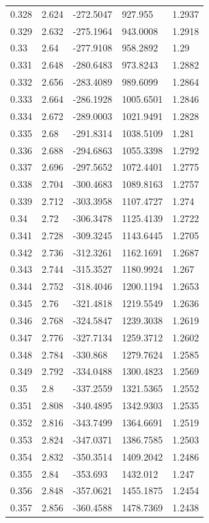 \begin{tabular}{lllll}
0.328 & 2.624 & -272.5047 & 927.955 & 1.2937 \\
0.329 & 2.632 & -275.1964 & 943.0008 & 1.2918 \\
0.33 & 2.64 & -277.9108 & 958.2892 & 1.29 \\
0.331 & 2.648 & -280.6483 & 973.8243 & 1.2882 \\
0.332 & 2.656 & -283.4089 & 989.6099 & 1.2864 \\
0.333 & 2.664 & -286.1928 & 1005.6501 & 1.2846 \\
0.334 & 2.672 & -289.0003 & 1021.9491 & 1.2828 \\
0.335 & 2.68 & -291.8314 & 1038.5109 & 1.281 \\
0.336 & 2.688 & -294.6863 & 1055.3398 & 1.2792 \\
0.337 & 2.696 & -297.5652 & 1072.4401 & 1.2775 \\
0.338 & 2.704 & -300.4683 & 1089.8163 & 1.2757 \\
0.339 & 2.712 & -303.3958 & 1107.4727 & 1.274 \\
0.34 & 2.72 & -306.3478 & 1125.4139 & 1.2722 \\
0.341 & 2.728 & -309.3245 & 1143.6445 & 1.2705 \\
0.342 & 2.736 & -312.3261 & 1162.1691 & 1.2687 \\
0.343 & 2.744 & -315.3527 & 1180.9924 & 1.267 \\
0.344 & 2.752 & -318.4046 & 1200.1194 & 1.2653 \\
0.345 & 2.76 & -321.4818 & 1219.5549 & 1.2636 \\
0.346 & 2.768 & -324.5847 & 1239.3038 & 1.2619 \\
0.347 & 2.776 & -327.7134 & 1259.3712 & 1.2602 \\
0.348 & 2.784 & -330.868 & 1279.7624 & 1.2585 \\
0.349 & 2.792 & -334.0488 & 1300.4823 & 1.2569 \\
0.35 & 2.8 & -337.2559 & 1321.5365 & 1.2552 \\
0.351 & 2.808 & -340.4895 & 1342.9303 & 1.2535 \\
0.352 & 2.816 & -343.7499 & 1364.6691 & 1.2519 \\
0.353 & 2.824 & -347.0371 & 1386.7585 & 1.2503 \\
0.354 & 2.832 & -350.3514 & 1409.2042 & 1.2486 \\
0.355 & 2.84 & -353.693 & 1432.012 & 1.247 \\
0.356 & 2.848 & -357.0621 & 1455.1875 & 1.2454 \\
0.357 & 2.856 & -360.4588 & 1478.7369 & 1.2438 \\

\end{tabular}
